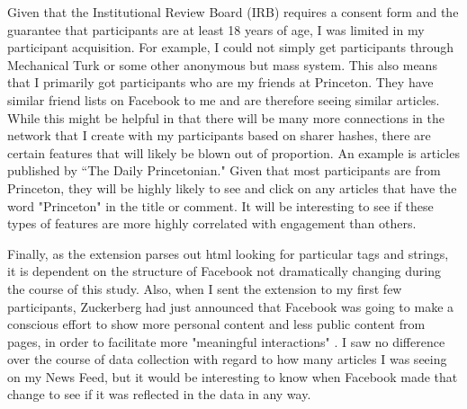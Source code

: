 Given that the Institutional Review Board (IRB) requires a consent form and the guarantee that participants are at least 18 years of age, I was limited in my participant acquisition.  For example, I could not simply get participants through Mechanical Turk or some other anonymous but mass system.  This also means that I primarily got participants who are my friends at Princeton.  They have similar friend lists on Facebook to me and are therefore seeing similar articles.  While this might be helpful in that there will be many more connections in the network that I create with my participants based on sharer hashes, there are certain features that will likely be blown out of proportion.  An example is articles published by ``The Daily Princetonian."  Given that most participants are from Princeton, they will be highly likely to see and click on any articles that have the word "Princeton" in the title or comment.  It will be interesting to see if these types of features are more highly correlated with engagement than others.

Finally, as the extension parses out html looking for particular tags and strings, it is dependent on the structure of Facebook not dramatically changing during the course of this study.  Also, when I sent the extension to my first few participants, Zuckerberg had just announced that Facebook was going to make a conscious effort to show more personal content and less public content from pages, in order to facilitate more "meaningful interactions" \cite{zuckpost}.  I saw no difference over the course of data collection with regard to how many articles I was seeing on my News Feed, but it would be interesting to know when Facebook made that change to see if it was reflected in the data in any way.
